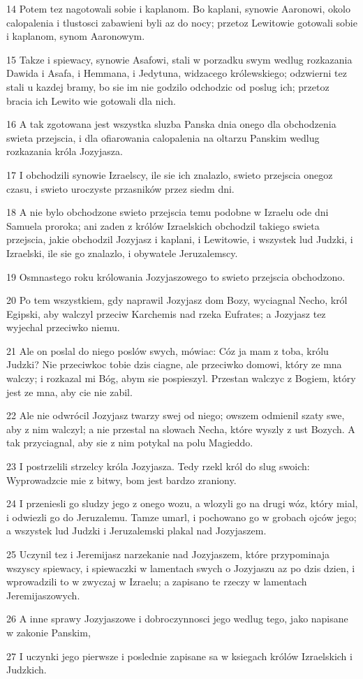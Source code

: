 \par 14 Potem tez nagotowali sobie i kaplanom. Bo kaplani, synowie Aaronowi, okolo calopalenia i tlustosci zabawieni byli az do nocy; przetoz Lewitowie gotowali sobie i kaplanom, synom Aaronowym.
\par 15 Takze i spiewacy, synowie Asafowi, stali w porzadku swym wedlug rozkazania Dawida i Asafa, i Hemmana, i Jedytuna, widzacego królewskiego; odzwierni tez stali u kazdej bramy, bo sie im nie godzilo odchodzic od poslug ich; przetoz bracia ich Lewito wie gotowali dla nich.
\par 16 A tak zgotowana jest wszystka sluzba Panska dnia onego dla obchodzenia swieta przejscia, i dla ofiarowania calopalenia na oltarzu Panskim wedlug rozkazania króla Jozyjasza.
\par 17 I obchodzili synowie Izraelscy, ile sie ich znalazlo, swieto przejscia onegoz czasu, i swieto uroczyste przasników przez siedm dni.
\par 18 A nie bylo obchodzone swieto przejscia temu podobne w Izraelu ode dni Samuela proroka; ani zaden z królów Izraelskich obchodzil takiego swieta przejscia, jakie obchodzil Jozyjasz i kaplani, i Lewitowie, i wszystek lud Judzki, i Izraelski, ile sie go znalazlo, i obywatele Jeruzalemscy.
\par 19 Osmnastego roku królowania Jozyjaszowego to swieto przejscia obchodzono.
\par 20 Po tem wszystkiem, gdy naprawil Jozyjasz dom Bozy, wyciagnal Necho, król Egipski, aby walczyl przeciw Karchemis nad rzeka Eufrates; a Jozyjasz tez wyjechal przeciwko niemu.
\par 21 Ale on poslal do niego poslów swych, mówiac: Cóz ja mam z toba, królu Judzki? Nie przeciwkoc tobie dzis ciagne, ale przeciwko domowi, który ze mna walczy; i rozkazal mi Bóg, abym sie pospieszyl. Przestan walczyc z Bogiem, który jest ze mna, aby cie nie zabil.
\par 22 Ale nie odwrócil Jozyjasz twarzy swej od niego; owszem odmienil szaty swe, aby z nim walczyl; a nie przestal na slowach Necha, które wyszly z ust Bozych. A tak przyciagnal, aby sie z nim potykal na polu Magieddo.
\par 23 I postrzelili strzelcy króla Jozyjasza. Tedy rzekl król do slug swoich: Wyprowadzcie mie z bitwy, bom jest bardzo zraniony.
\par 24 I przeniesli go sludzy jego z onego wozu, a wlozyli go na drugi wóz, który mial, i odwiezli go do Jeruzalemu. Tamze umarl, i pochowano go w grobach ojców jego; a wszystek lud Judzki i Jeruzalemski plakal nad Jozyjaszem.
\par 25 Uczynil tez i Jeremijasz narzekanie nad Jozyjaszem, które przypominaja wszyscy spiewacy, i spiewaczki w lamentach swych o Jozyjaszu az po dzis dzien, i wprowadzili to w zwyczaj w Izraelu; a zapisano te rzeczy w lamentach Jeremijaszowych.
\par 26 A inne sprawy Jozyjaszowe i dobroczynnosci jego wedlug tego, jako napisane w zakonie Panskim,
\par 27 I uczynki jego pierwsze i poslednie zapisane sa w ksiegach królów Izraelskich i Judzkich.

